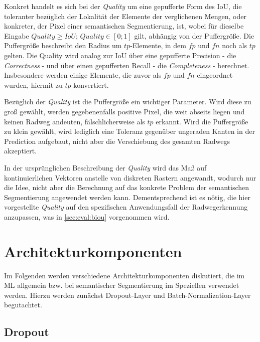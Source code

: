 Konkret handelt es sich bei der \textit{Quality} um eine gepufferte Form des \ac{IoU},
die toleranter bezüglich der Lokalität der Elemente der verglichenen Mengen, oder konkreter,
der Pixel einer semantischen Segmentierung, ist, 
wobei für dieselbe Eingabe $Quality \geq IoU$; $Quality \in [0;1]$ gilt, abhängig von der Puffergröße. 
Die Puffergröße beschreibt den Radius um $tp$-Elemente, in dem $fp$ und $fn$ noch als $tp$ gelten.   
Die Quality wird analog zur \ac{IoU} über eine gepufferte Precision - die \textit{Correctness} - 
und über einen gepufferten Recall - die \textit{Completeness} - berechnet. Insbesondere werden einige Elemente, 
die zuvor als $fp$ und $fn$ eingeordnet wurden, hiermit zu $tp$ konvertiert.

Bezüglich der \textit{Quality} ist die Puffergröße ein wichtiger Parameter.
Wird diese zu groß gewählt, werden gegebenenfalls positive Pixel, die weit abseits liegen und keinen Radweg andeuten, fälschlicherweise 
als $tp$ erkannt. Wird die Puffergröße zu klein gewählt, wird lediglich eine Toleranz gegenüber ungeraden 
Kanten in der Prediction aufgebaut, nicht aber die Verschiebung des gesamten Radwegs akzeptiert.

In der ursprünglichen Beschreibung der \textit{Quality} wird das Maß auf kontinuierlichen Vektoren anstelle von diskreten Rastern angewandt, wodurch nur die 
Idee, nicht aber die Berechnung auf das konkrete Problem der semantischen Segmentierung angewendet werden kann. Dementsprechend ist es nötig, 
die hier vorgestellte \textit{Quality} auf den spezifischen Anwendungsfall der Radwegerkennung anzupassen, 
was in \autoref{sec:eval:biou} vorgenommen wird. 

\section{Architekturkomponenten}

Im Folgenden werden verschiedene Architekturkomponenten diskutiert, die im \ac{ML} allgemein 
bzw. bei semantischer Segmentierung im Speziellen verwendet werden. Hierzu werden zunächst Dropout-Layer 
und Batch-Normalization-Layer begutachtet. 

\subsection{Dropout} \label{sec:architekturkomponenten:dropout}

